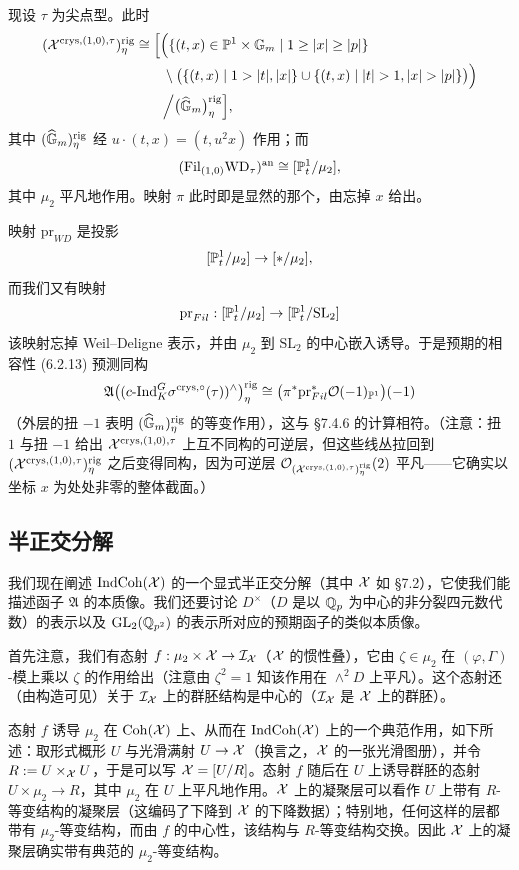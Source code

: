 现设 $\tau$ 为尖点型。此时
\begin{align*}
(\XX^{\mathrm{crys},(1,0),\tau})^{\mathrm{rig}}_\eta
&\cong\Bigl[\Bigl(\{(t,x)\in\PP^{1}\times\GG_m\mid 1\ge|x|\ge|p|\}\\
&\qquad\setminus\bigl(\{(t,x)\mid 1>|t|,|x|\}\cup\{(t,x)\mid |t|>1,|x|>|p|\}\bigr)\Bigr)\\
&\qquad\Big/\bigl(\wh{\GG}_m\bigr)^{\mathrm{rig}}_\eta\Bigr],
\end{align*}
其中 $(\widehat{\mathbb{G}}_m)^{\mathrm{rig}}_\eta$ 经 $u\cdot(t,x)=(t,u^2x)$ 作用；而
\[
(\mathrm{Fil}_{(1,0)}\mathrm{WD}_\tau)^{\mathrm{an}}\cong[\mathbb{P}^{1}_t/\mu_2],
\]
其中 $\mu_2$ 平凡地作用。映射 $\pi$ 此时即是显然的那个，由忘掉 $x$ 给出。

映射 $\mathrm{pr}_{WD}$ 是投影
\[
[\mathbb{P}^{1}_t/\mu_2]\to[*/\mu_2],
\]
而我们又有映射
\[
\mathrm{pr}_{Fil}:[\mathbb{P}^{1}_t/\mu_2]\to[\mathbb{P}^{1}_t/\mathrm{SL}_2]
\]
该映射忘掉 Weil--Deligne 表示，并由 $\mu_2$ 到 $\mathrm{SL}_2$ 的中心嵌入诱导。于是预期的相容性 (6.2.13) 预测同构
\[
\mathfrak A\bigl((c\text{-}\mathrm{Ind}_K^G\sigma^{\mathrm{crys},\circ}(\tau))^\wedge\bigr)^{\mathrm{rig}}_\eta
\cong\bigl(\pi^{*}\mathrm{pr}_{Fil}^{*}\mathcal{O}(-1)_{\mathbb{P}^{1}}\bigr)(-1)
\]
（外层的扭 $-1$ 表明 $(\widehat{\mathbb{G}}_m)^{\mathrm{rig}}_\eta$ 的等变作用），这与 §7.4.6 的计算相符。（注意：扭 $1$ 与扭 $-1$ 给出 $\mathcal{X}^{\mathrm{crys},(1,0),\tau}$ 上互不同构的可逆层，但这些线丛拉回到 $(\mathcal{X}^{\mathrm{crys},(1,0),\tau})^{\mathrm{rig}}_\eta$ 之后变得同构，因为可逆层 $\mathcal{O}_{(\mathcal{X}^{\mathrm{crys},(1,0),\tau})^{\mathrm{rig}}_\eta}(2)$ 平凡——它确实以坐标 $x$ 为处处非零的整体截面。）

\subsection{半正交分解}
我们现在阐述 $\operatorname{IndCoh}(\mathcal{X})$ 的一个显式半正交分解（其中 $\mathcal{X}$ 如 §7.2），它使我们能描述函子 $\mathfrak A$ 的本质像。我们还要讨论 $D^\times$（$D$ 是以 $\mathbb{Q}_p$ 为中心的非分裂四元数代数）的表示以及 $\mathrm{GL}_2(\mathbb{Q}_{p^2})$ 的表示所对应的预期函子的类似本质像。

首先注意，我们有态射 $f:\mu_2\times\mathcal{X}\to\mathcal I_{\mathcal{X}}$（$\mathcal{X}$ 的惯性叠），它由 $\zeta\in\mu_2$ 在 $(\varphi,\Gamma)$-模上乘以 $\zeta$ 的作用给出（注意由 $\zeta^2=1$ 知该作用在 $\wedge^2D$ 上平凡）。这个态射还（由构造可见）关于 $\mathcal I_{\mathcal{X}}$ 上的群胚结构是中心的（$\mathcal I_{\mathcal{X}}$ 是 $\mathcal{X}$ 上的群胚）。

态射 $f$ 诱导 $\mu_2$ 在 $\operatorname{Coh}(\mathcal{X})$ 上、从而在 $\operatorname{IndCoh}(\mathcal{X})$ 上的一个典范作用，如下所述：取形式概形 $U$ 与光滑满射 $U\to\mathcal{X}$（换言之，$\mathcal{X}$ 的一张光滑图册），并令 $R:=U\times_{\mathcal{X}}U$，于是可以写 $\mathcal{X}=[U/R]$。态射 $f$ 随后在 $U$ 上诱导群胚的态射 $U\times\mu_2\to R$，其中 $\mu_2$ 在 $U$ 上平凡地作用。$\mathcal{X}$ 上的凝聚层可以看作 $U$ 上带有 $R$-等变结构的凝聚层（这编码了下降到 $\mathcal{X}$ 的下降数据）；特别地，任何这样的层都带有 $\mu_2$-等变结构，而由 $f$ 的中心性，该结构与 $R$-等变结构交换。因此 $\mathcal{X}$ 上的凝聚层确实带有典范的 $\mu_2$-等变结构。

